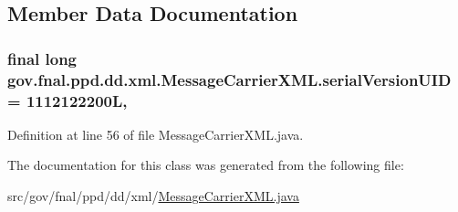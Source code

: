 \subsection{Member Data Documentation}
\hypertarget{classgov_1_1fnal_1_1ppd_1_1dd_1_1xml_1_1MessageCarrierXML_addbf53e6678de784e9f2f7a4804c48cf}{
\subsubsection[{serial\-Version\-U\-I\-D}]{\setlength{\rightskip}{0pt plus 5cm}final long gov.\-fnal.\-ppd.\-dd.\-xml.\-Message\-Carrier\-X\-M\-L.\-serial\-Version\-U\-I\-D = 1112122200\-L\hspace{0.3cm}{\ttfamily [static]}, {\ttfamily [protected]}}}\label{classgov_1_1fnal_1_1ppd_1_1dd_1_1xml_1_1MessageCarrierXML_addbf53e6678de784e9f2f7a4804c48cf}


Definition at line 56 of file Message\-Carrier\-X\-M\-L.\-java.



The documentation for this class was generated from the following file\-:\begin{DoxyCompactItemize}
\item 
src/gov/fnal/ppd/dd/xml/\hyperlink{MessageCarrierXML_8java}{Message\-Carrier\-X\-M\-L.\-java}\end{DoxyCompactItemize}
